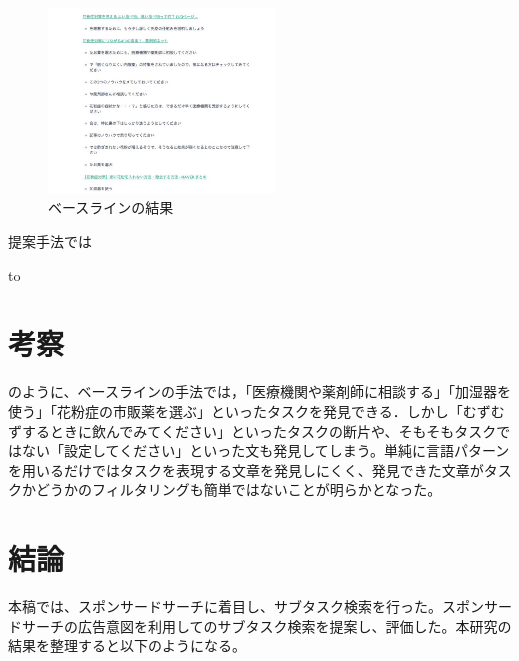 \documentclass[submit,techreq]{ipsj}
\begin{document}
\begin{figure}[tb]
\includegraphics[width=6cm, bb=0 0 550 719]{base_line3.jpg}
\caption{ベースラインの結果}
\label{fig:baseline_result}
\end{figure}


提案手法では

\begin{table}[tb] 
\caption{花粉症対策の方法タスク検索} 
\label{tab:result}
\hbox to
\end{table}



\section{考察}


のように、ベースラインの手法では，「医療機関や薬剤師に相談する」「加湿器を使う」「花粉症の市販薬を選ぶ」といったタスクを発見できる．しかし「むずむずするときに飲んでみてください」といったタスクの断片や、そもそもタスクではない「設定してください」といった文も発見してしまう。単純に言語パターンを用いるだけではタスクを表現する文章を発見しにくく、発見できた文章がタスクかどうかのフィルタリングも簡単ではないことが明らかとなった。


\section{結論}
本稿では、スポンサードサーチに着目し、サブタスク検索を行った。スポンサードサーチの広告意図を利用してのサブタスク検索を提案し、評価した。本研究の結果を整理すると以下のようになる。
\end{document}
